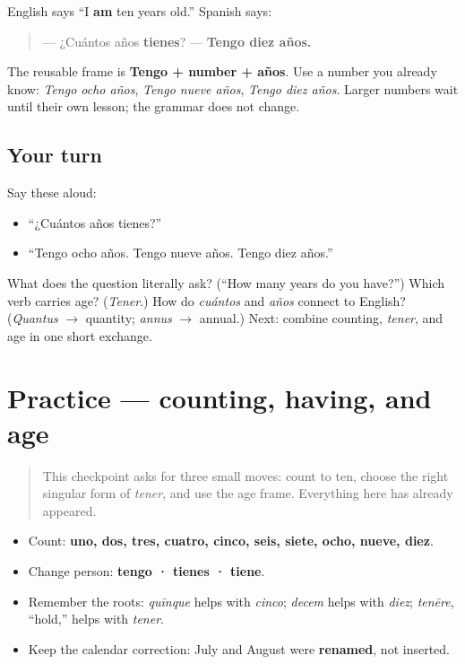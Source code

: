 \begin{grammarlens}[title={Grammar Lens: Spanish “has” years}]
English says “I \textbf{am} ten years old.” Spanish says:

\begin{quote}
— ¿Cuántos años \textbf{tienes}? — \textbf{Tengo diez años.}
\end{quote}

The reusable frame is \textbf{Tengo + number + años}. Use a number you already know: \emph{Tengo ocho años}, \emph{Tengo nueve años}, \emph{Tengo diez años}. Larger numbers wait until their own lesson; the grammar does not change.
\end{grammarlens}

\subsection*{Your turn}
Say these aloud:

\begin{itemize}
\raggedright
  \item “¿Cuántos años tienes?”
  \item “Tengo ocho años. Tengo nueve años. Tengo diez años.”
\end{itemize}

\begin{tcolorbox}[breakable,colback=teal!4,colframe=teal!35!black,title={Before you move on}]
What does the question literally ask? (“How many years do you have?”) Which verb carries age? (\emph{Tener}.) How do \emph{cuántos} and \emph{años} connect to English? (\emph{Quantus} $\to$ quantity; \emph{annus} $\to$ annual.) Next: combine counting, \emph{tener}, and age in one short exchange.
\end{tcolorbox}
\section[Practice]{Practice — counting, having, and age}

\label{lesson:ES-C08-practice}



\begin{quote}
This checkpoint asks for three small moves: count to ten, choose the right singular form of \emph{tener}, and use the age frame. Everything here has already appeared.
\end{quote}

\begin{grammarlens}[title={Grammar Lens: count and conjugate}]
\begin{itemize}
\raggedright
  \item Count: \textbf{uno, dos, tres, cuatro, cinco, seis, siete, ocho, nueve, diez}.
  \item Change person: \textbf{tengo · tienes · tiene}.
  \item Remember the roots: \emph{quīnque} helps with \emph{cinco}; \emph{decem} helps with \emph{diez}; \emph{tenēre}, “hold,” helps with \emph{tener}.
  \item Keep the calendar correction: July and August were \textbf{renamed}, not inserted.
\end{itemize}
\end{grammarlens}

